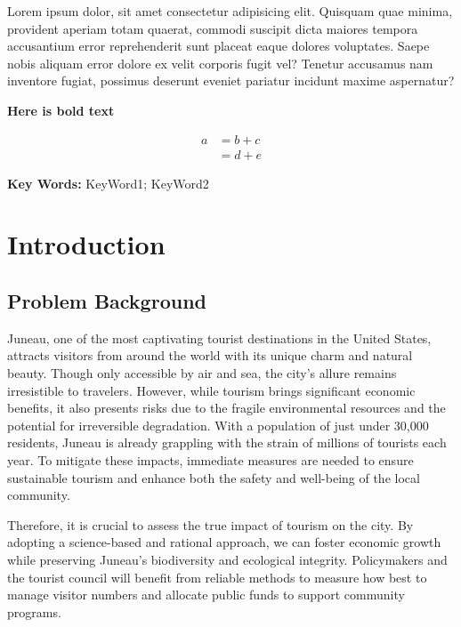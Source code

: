 \documentclass[UTF8]{mcmthesis}
\begin{document}
\begin{summary}
        Lorem ipsum dolor, sit amet consectetur adipisicing elit. Quisquam quae minima, provident aperiam totam quaerat, commodi suscipit dicta maiores tempora accusantium error reprehenderit sunt placeat eaque dolores voluptates. Saepe nobis aliquam error dolore ex velit corporis fugit vel? Tenetur accusamus nam inventore fugiat, possimus deserunt eveniet pariatur incidunt maxime aspernatur?

        \textbf{Here is bold text}

        $$
        \begin{aligned}
        a & =b+c \\
        & =d+e
        \end{aligned}
        $$

    
        \vspace{2em}
        \noindent\textbf{Key Words: } KeyWord1; KeyWord2
    \end{summary}

    \maketitle
    \newpage
    \tableofcontents

    \newpage
    \setcounter{page}{1}
    \section{Introduction}
        \subsection{Problem Background}
            \hspace*{2em}Juneau, one of the most captivating tourist destinations in the United States, attracts visitors from around the world with its unique charm and natural beauty. Though only accessible by air and sea, the city’s allure remains irresistible to travelers.
            However, while tourism brings significant economic benefits, it also presents risks due to the fragile environmental resources and the potential for irreversible degradation. With a population of just under 30,000 residents, Juneau is already grappling with the strain of millions of tourists each year. To mitigate these impacts, immediate measures are needed to ensure sustainable tourism and enhance both the safety and well-being of the local community.
            
            Therefore, it is crucial to assess the true impact of tourism on the city. By adopting a science-based and rational approach, we can foster economic growth while preserving Juneau’s biodiversity and ecological integrity. Policymakers and the tourist council will benefit from reliable methods to measure how best to manage visitor numbers and allocate public funds to support community programs.
            
\end{document}
